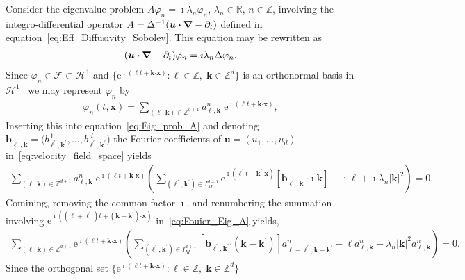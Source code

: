 \documentclass[leqno,onefignum,onetabnum]{siamltex1213}
\newcommand{\e}{\mathrm{e}}
\newcommand{\Hs}{\mathscr{H}}
\newcommand{\Fs}{\mathscr{F}}
\newcommand\bnabla{\mbox{\boldmath${\nabla}$}}
\providecommand\bcdot{\boldsymbol{\cdot}}
\newcommand{\vecb}{\boldsymbol{b}}
\newcommand{\vecx}{\boldsymbol{x}}
\newcommand{\vecu}{\boldsymbol{u}}
\newcommand{\veck}{\boldsymbol{k}}
\begin{document}
Consider the eigenvalue problem $A\varphi_n=\imath\lambda_n\varphi_n$, $\lambda_n\in\mathbb{R}$,
$n\in\mathbb{Z}$, involving the integro-differential operator 
$A=\Delta^{-1}(\vecu \bcdot\bnabla -\partial_t)$ defined in
equation~\eqref{eq:Eff_Diffusivity_Sobolev}. This equation may be
rewritten as       
%
\begin{align}\label{eq:Eig_prob_A}
  (\vecu \bcdot\bnabla -\partial_t)\varphi_n=\imath\lambda_n\Delta\varphi_n.
\end{align}
%
Since $\varphi_n\in\Fs\subset\Hs^1$ and
$\{\e^{\imath(\ell t+\veck\bcdot\vecx)}:\ell\in\mathbb{Z},\;\veck\in\mathbb{Z}^d\}$ 
is an orthonormal basis in $\Hs^1$~\cite{Folland:99} we may represent
$\varphi_n$ by
% 
\begin{align}\label{eq:Fourier_Eig_fun}
  \varphi_n(t,\vecx)=\sum_{(\ell,\veck)\in\mathbb{Z}^{d+1}}a^n_{\ell,\veck}\;\e^{\imath(\ell t+\veck\bcdot\vecx)},
\end{align}
%
Inserting this into equation~\eqref{eq:Eig_prob_A} and denoting 
$\vecb_{\ell^\prime,\veck}=\big(b^{\,1}_{\ell^\prime,\veck^\prime},\ldots,b^{\,d}_{\ell^\prime,\veck^\prime}\big)$
the Fourier coefficients of $\vecu =(u_1,\ldots,u_d)$
in~\eqref{eq:velocity_field_space} yields    
%
\begin{align}\label{eq:Fouier_Eig_A}
  \sum_{(\ell,\veck)\in\mathbb{Z}^{d+1}
  }a^n_{\ell,\veck}\;\e^{\imath(\ell t+\veck\bcdot\vecx)}
  \left(
    \sum_{(\ell^\prime,\veck^\prime)\in I_M^{d+1}}\e^{\imath(\ell^\prime t+\veck^\prime\bcdot\vecx)}
  \left[\vecb_{\ell^\prime,\veck^\prime}\bcdot\imath\veck
       \right]
  -\imath\ell
  +\imath\lambda_n|\veck|^2\right)=0.
\end{align}
%
Comining, removing the common factor $\imath$, and renumbering the summation
involving $\e^{\imath((\ell+\ell^\prime)t+(\veck+\veck^\prime)\bcdot\vecx)}$
in~\eqref{eq:Fouier_Eig_A} yields, 
%
\begin{align}\label{eq:Fouier_Eig_A_resum}
  \sum_{(\ell,\veck)\in\mathbb{Z}^{d+1}}\e^{\imath(\ell t+\veck\bcdot\vecx)}
  \left(
    \sum_{(\ell^\prime,\veck^\prime)\in I_M^{d+1}}
  \left[\vecb_{\ell^\prime,\veck^\prime}\bcdot(\veck-\veck^\prime)
       \right]a^n_{\ell-\ell^\prime,\veck-\veck^\prime}
  -\ell a^n_{\ell,\veck}
  +\lambda_n|\veck|^2a^n_{\ell,\veck}\right)=0.
\end{align}
%
Since the orthogonal set
$\{\e^{\imath(\ell t+\veck\bcdot\vecx)}:\ell\in\mathbb{Z},\;\veck\in\mathbb{Z}^d\}$
\end{document}
